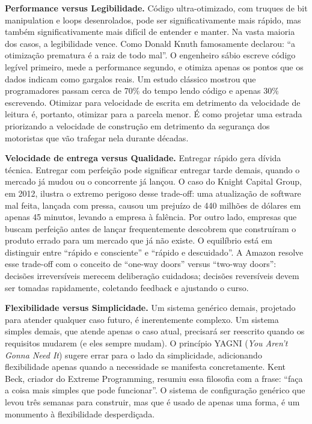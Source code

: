 \textbf{Performance versus Legibilidade.} Código ultra-otimizado, com
truques de bit manipulation e loops desenrolados, pode ser
significativamente mais rápido, mas também significativamente mais
difícil de entender e manter. Na vasta maioria dos casos, a legibilidade
vence. Como Donald Knuth famosamente declarou: ``a otimização prematura
é a raiz de todo mal''. O engenheiro sábio escreve código legível
primeiro, mede a performance segundo, e otimiza apenas os pontos que os
dados indicam como gargalos reais. Um estudo clássico mostrou que
programadores passam cerca de 70\% do tempo lendo código e apenas 30\%
escrevendo. Otimizar para velocidade de escrita em detrimento da
velocidade de leitura é, portanto, otimizar para a parcela menor. É como
projetar uma estrada priorizando a velocidade de construção em detrimento
da segurança dos motoristas que vão trafegar nela durante décadas.

\textbf{Velocidade de entrega versus Qualidade.} Entregar rápido gera
dívida técnica. Entregar com perfeição pode significar entregar tarde
demais, quando o mercado já mudou ou o concorrente já lançou. O caso
do Knight Capital Group, em 2012, ilustra o extremo perigoso desse
trade-off: uma atualização de software mal feita, lançada com pressa,
causou um prejuízo de 440 milhões de dólares em apenas 45 minutos,
levando a empresa à falência. Por outro lado, empresas que buscam
perfeição antes de lançar frequentemente descobrem que construíram o
produto errado para um mercado que já não existe. O equilíbrio está em
distinguir entre ``rápido e consciente'' e ``rápido e descuidado''. A
Amazon resolve esse trade-off com o conceito de ``one-way doors'' versus
``two-way doors'': decisões irreversíveis merecem deliberação cuidadosa;
decisões reversíveis devem ser tomadas rapidamente, coletando feedback e
ajustando o curso.

\textbf{Flexibilidade versus Simplicidade.} Um sistema genérico demais,
projetado para atender qualquer caso futuro, é inerentemente complexo.
Um sistema simples demais, que atende apenas o caso atual, precisará ser
reescrito quando os requisitos mudarem (e eles sempre mudam). O
princípio YAGNI (\emph{You Aren't Gonna Need It}) sugere errar para o
lado da simplicidade, adicionando flexibilidade apenas quando a
necessidade se manifesta concretamente. Kent Beck, criador do Extreme
Programming, resumiu essa filosofia com a frase: ``faça a coisa mais
simples que pode funcionar''. O sistema de configuração genérico que
levou três semanas para construir, mas que é usado de apenas uma forma,
é um monumento à flexibilidade desperdiçada.

